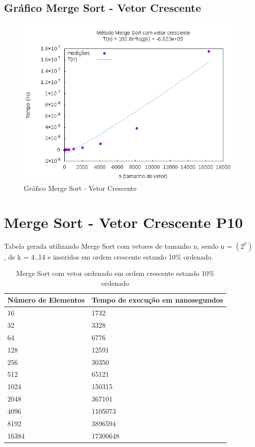 \documentclass[12pt,a4paper,twoside]{report}
\begin{document}
\subsection{Gráfico Merge Sort - Vetor Crescente}
\begin{figure}[H]
    \centering
    \includegraphics[width=0.7\linewidth]{graficos/MergeSort/vIntCrescente/vIntCrescente.png}
  \caption{Gráfico Merge Sort - Vetor Crescente}
\end{figure}

\section{Merge Sort - Vetor Crescente P10}
Tabela gerada utilizando Merge Sort com vetores de tamanho n, sendo n = $(2^k)$, de k = 4..14 e inseridos em ordem crescente estando 10\% ordenado.
\begin{table}[H]
\centering
\caption{Merge Sort com vetor ordenado em ordem crescente estando 10\% ordenado}
\label{my-label}
\begin{tabular}{|l|l|}
\hline
\multicolumn{1}{|c|}{\textbf{Número de Elementos}} & \multicolumn{1}{c|}{\textbf{Tempo de execução em nanosegundos}} \\ \hline
16 & 1732 \\ \hline
32 & 3328 \\ \hline
64 & 6776 \\ \hline
128 & 12591 \\ \hline
256 & 30350 \\ \hline
512 & 65121 \\ \hline
1024 & 150315 \\ \hline
2048 & 367101 \\ \hline
4096 & 1105073 \\ \hline
8192 & 3896594 \\ \hline
16384 & 17300648 \\ \hline
\end{tabular}
\end{table}
\end{document}
